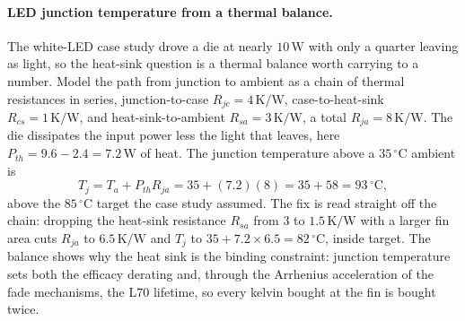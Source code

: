 \paragraph{LED junction temperature from a thermal balance.}
The white-LED case study drove a die at nearly $10\,\si{\watt}$ with only a
quarter leaving as light, so the heat-sink question is a thermal balance
worth carrying to a number. Model the path from junction to ambient as a
chain of thermal resistances in series, junction-to-case $R_{jc} = 4\,\si{
\kelvin\per\watt}$, case-to-heat-sink $R_{cs} = 1\,\si{\kelvin\per\watt}$,
and heat-sink-to-ambient $R_{sa} = 3\,\si{\kelvin\per\watt}$, a total
$R_{ja} = 8\,\si{\kelvin\per\watt}$. The die dissipates the input power less
the light that leaves, here $P_{th} = 9.6 - 2.4 = 7.2\,\si{\watt}$ of heat.
The junction temperature above a $35\,{}^{\circ}\mathrm{C}$ ambient is
\[
T_j = T_a + P_{th}R_{ja} = 35 + (7.2)(8) = 35 + 58 = 93\,{}^{\circ}
\mathrm{C},
\]
above the $85\,{}^{\circ}\mathrm{C}$ target the case study assumed. The fix
is read straight off the chain: dropping the heat-sink resistance $R_{sa}$
from $3$ to $1.5\,\si{\kelvin\per\watt}$ with a larger fin area cuts $R_{ja}$
to $6.5\,\si{\kelvin\per\watt}$ and $T_j$ to $35 + 7.2\times 6.5 =
82\,{}^{\circ}\mathrm{C}$, inside target. The balance shows why the heat sink
is the binding constraint: junction temperature sets both the efficacy
derating and, through the Arrhenius acceleration of the fade mechanisms, the
L70 lifetime, so every kelvin bought at the fin is bought twice.

